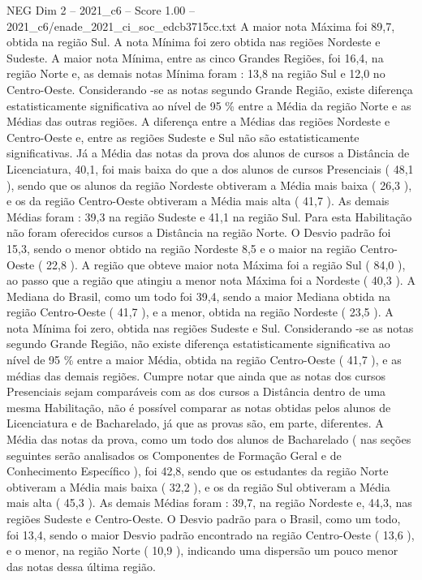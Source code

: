 \begin{textsample}{NEG Dim 2 – 2021\_c6 – Score 1.00 – 2021\_c6/enade\_2021\_ci\_soc\_edcb3715cc.txt}
A maior nota Máxima foi 89,7, obtida na região Sul.
A nota Mínima foi zero obtida nas regiões Nordeste e Sudeste.
A maior nota Mínima, entre as cinco Grandes Regiões, foi 16,4, na região Norte e, as demais notas Mínima foram : 13,8 na região Sul e 12,0 no Centro-Oeste.
Considerando -se as notas segundo Grande Região, existe diferença estatisticamente significativa ao nível de 95 \% entre a Média da região Norte e as Médias das outras regiões.
A diferença entre a Médias das regiões Nordeste e Centro-Oeste e, entre as regiões Sudeste e Sul não são estatisticamente significativas.
Já a Média das notas da prova dos alunos de cursos a Distância de Licenciatura, 40,1, foi mais baixa do que a dos alunos de cursos Presenciais ( 48,1 ), sendo que os alunos da região Nordeste obtiveram a Média mais baixa ( 26,3 ), e os da região Centro-Oeste obtiveram a Média mais alta ( 41,7 ).
As demais Médias foram : 39,3 na região Sudeste e 41,1 na região Sul.
Para esta Habilitação não foram oferecidos cursos a Distância na região Norte.
O Desvio padrão foi 15,3, sendo o menor obtido na região Nordeste 8,5 e o maior na região Centro-Oeste ( 22,8 ).
A região que obteve maior nota Máxima foi a região Sul ( 84,0 ), ao passo que a região que atingiu a menor nota Máxima foi a Nordeste ( 40,3 ).
A Mediana do Brasil, como um todo foi 39,4, sendo a maior Mediana obtida na região Centro-Oeste ( 41,7 ), e a menor, obtida na região Nordeste ( 23,5 ).
A nota Mínima foi zero, obtida nas regiões Sudeste e Sul.
Considerando -se as notas segundo Grande Região, não existe diferença estatisticamente significativa ao nível de 95 \% entre a maior Média, obtida na região Centro-Oeste ( 41,7 ), e as médias das demais regiões.
Cumpre notar que ainda que as notas dos cursos Presenciais sejam comparáveis com as dos cursos a Distância dentro de uma mesma Habilitação, não é possível comparar as notas obtidas pelos alunos de Licenciatura e de Bacharelado, já que as provas são, em parte, diferentes.
A Média das notas da prova, como um todo dos alunos de Bacharelado ( nas seções seguintes serão analisados os Componentes de Formação Geral e de Conhecimento Específico ), foi 42,8, sendo que os estudantes da região Norte obtiveram a Média mais baixa ( 32,2 ), e os da região Sul obtiveram a Média mais alta ( 45,3 ).
As demais Médias foram : 39,7, na região Nordeste e, 44,3, nas regiões Sudeste e Centro-Oeste.
O Desvio padrão para o Brasil, como um todo, foi 13,4, sendo o maior Desvio padrão encontrado na região Centro-Oeste ( 13,6 ), e o menor, na região Norte ( 10,9 ), indicando uma dispersão um pouco menor das notas dessa última região.

\end{textsample}
